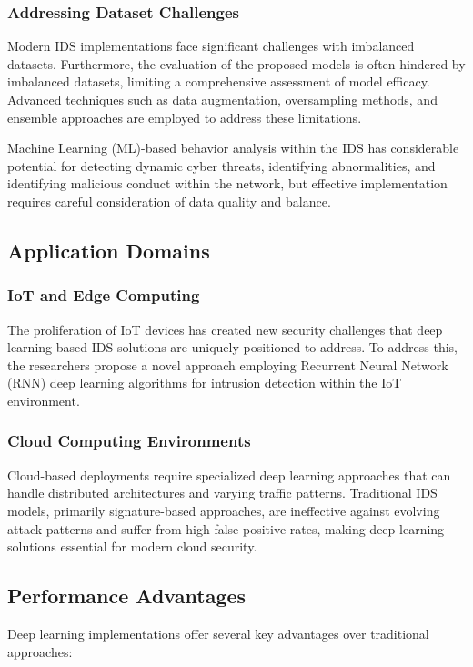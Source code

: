 \documentclass[12pt]{report}
\begin{document}
\subsubsection{Addressing Dataset Challenges}
Modern IDS implementations face significant challenges with imbalanced datasets. Furthermore, the evaluation of the proposed models is often hindered by imbalanced datasets, limiting a comprehensive assessment of model efficacy. Advanced techniques such as data augmentation, oversampling methods, and ensemble approaches are employed to address these limitations.

Machine Learning (ML)-based behavior analysis within the IDS has considerable potential for detecting dynamic cyber threats, identifying abnormalities, and identifying malicious conduct within the network, but effective implementation requires careful consideration of data quality and balance.

\subsection{Application Domains}

\subsubsection{IoT and Edge Computing}
The proliferation of IoT devices has created new security challenges that deep learning-based IDS solutions are uniquely positioned to address. To address this, the researchers propose a novel approach employing Recurrent Neural Network (RNN) deep learning algorithms for intrusion detection within the IoT environment.

\subsubsection{Cloud Computing Environments}
Cloud-based deployments require specialized deep learning approaches that can handle distributed architectures and varying traffic patterns. Traditional IDS models, primarily signature-based approaches, are ineffective against evolving attack patterns and suffer from high false positive rates, making deep learning solutions essential for modern cloud security.

\subsection{Performance Advantages}
Deep learning implementations offer several key advantages over traditional approaches:
\end{document}
